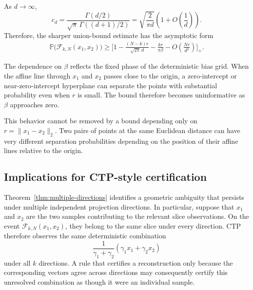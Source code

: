 \begin{remark}
\label{rem:large-dimensional-form}

As $d\to\infty$,
\begin{equation}
    c_d
    =
    \frac{\Gamma(d/2)}
         {\sqrt{\pi}\,\Gamma((d+1)/2)}
    =
    \sqrt{\frac{2}{\pi d}}
    \left(
        1+O\left(\frac{1}{d}\right)
    \right).
    \label{eq:cd-asymptotic}
\end{equation}
Therefore, the sharper union-bound estimate has the asymptotic form
\begin{align}
    \mathbb{P}\bigl(\mathcal{F}_{k,N}(x_1,x_2)\bigr)
    \geq
    \Biggl[
        1
        -
        \frac{(N-k)r}{\sqrt{2\pi}\,d}
        -
        \frac{kr}{\pi\beta}
        -
        O\left(\frac{Nr}{d^2}\right)
    \Biggr]_+.
    \label{eq:large-dimensional-failure-bound}
\end{align}
\end{remark}





\begin{remark}
\label{rem:role-of-beta}

The dependence on $\beta$ reflects the fixed phase of the deterministic
bias grid. When the affine line through $x_1$ and $x_2$ passes close to
the origin, a zero-intercept or near-zero-intercept hyperplane can
separate the points with substantial probability even when $r$ is
small. The bound therefore becomes uninformative as $\beta$ approaches
zero.

This behavior cannot be removed by a bound depending only on
$r=\|x_1-x_2\|_2$. Two pairs of points at the same Euclidean distance can
have very different separation probabilities depending on the
position of their affine lines relative to the origin.
\end{remark}


\subsection{Implications for CTP-style certification}
\label{app:multiple-ctp-directions:implications}

Theorem~\ref{thm:multiple-directions} identifies a geometric ambiguity
that persists under multiple independent projection directions. In
particular, suppose that $x_1$ and $x_2$ are the two samples contributing
to the relevant slice observations. On the event
$\mathcal{F}_{k,N}(x_1,x_2)$, they belong to the same slice under every
direction. CTP therefore observes the same deterministic combination
\[
    \frac{1}{\gamma_1+ \gamma_2
    }(\gamma_1 x_1+ \gamma_2 x_2)
\]
under all $k$ directions. A rule that certifies a reconstruction only
because the corresponding vectors agree across directions may
consequently certify this unresolved combination as though it were an
individual sample.

